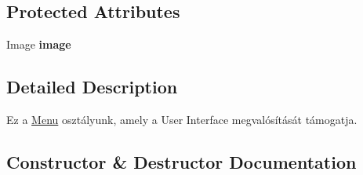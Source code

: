 \subsection*{Protected Attributes}
\begin{DoxyCompactItemize}
\item 
Image {\bfseries image}\hypertarget{class_main_1_1_menu_abcb08ae807d5401c995eebad7a6d0cf7}{}\label{class_main_1_1_menu_abcb08ae807d5401c995eebad7a6d0cf7}

\end{DoxyCompactItemize}


\subsection{Detailed Description}
Ez a \hyperlink{class_main_1_1_menu}{Menu} osztályunk, amely a User Interface megvalósítását támogatja. 

\subsection{Constructor \& Destructor Documentation}
